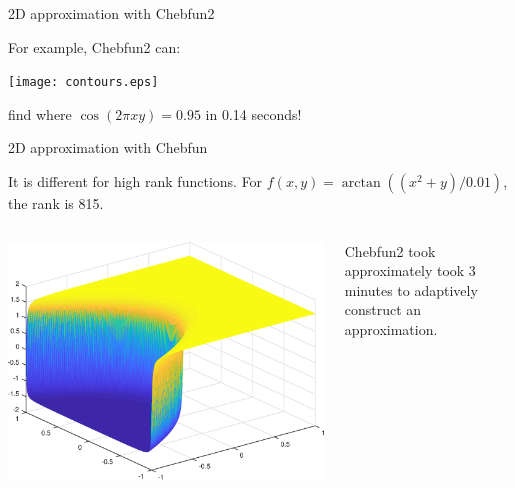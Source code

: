 \documentclass{beamer}
\newcommand{\lp}{\left(}
\newcommand{\rp}{\right)}
\begin{document}
\begin{frame}{2D approximation with Chebfun2}
	\begin{center}
	For example, Chebfun2 can:
	\end{center}

\begin{center}
\texttt{[image: contours.eps]}
\end{center}

\begin{center}
find where $\cos(2 \pi x y) = 0.95$ in 0.14 seconds!
\end{center}

\end{frame}

\begin{frame}{2D approximation with Chebfun}

\begin{center}
It is different for high rank functions. For $f(x,y) = \arctan \lp \lp x^2+y \rp/0.01 \rp$, the rank is 815.
\end{center}

\begin{columns}

\begin{column}{0.5\textwidth}	
\begin{center}
\includegraphics[scale = 0.3]{tan2Dplot.eps}	
\end{center}
\end{column}

\begin{column}{0.5\textwidth}
Chebfun2 took approximately took 3 minutes to adaptively construct an approximation.
\end{column}

\end{columns}

\end{frame}
\end{document}
